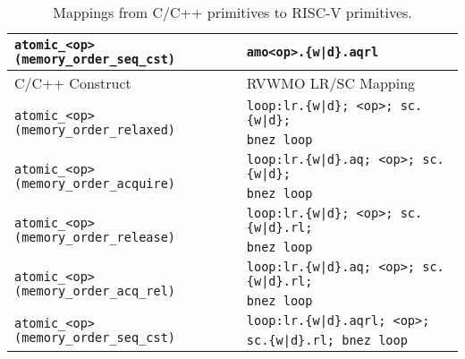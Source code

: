 \begin{table}[h!]
\begin{tabular}{|l|l|}
    \hline
    \tt atomic\_<op>(memory\_order\_seq\_cst) & \tt amo<op>.\{w|d\}.aqrl \\
    \hline
    \hline
    C/C++ Construct                           & RVWMO LR/SC Mapping\\
    \hline
    \multirow{2}{*}{\tt atomic\_<op>(memory\_order\_relaxed)}
      & \tt loop:\@ lr.\{w|d\}; <op>; sc.\{w|d\}; \\
      & \tt bnez loop \\
    \hline
    \multirow{2}{*}{\tt atomic\_<op>(memory\_order\_acquire)}
      & \tt loop:\@ lr.\{w|d\}.aq; <op>; sc.\{w|d\}; \\
      & \tt bnez loop \\
    \hline
    \multirow{2}{*}{\tt atomic\_<op>(memory\_order\_release)}
      & \tt loop:\@ lr.\{w|d\}; <op>; sc.\{w|d\}.rl; \\
      & \tt bnez loop \\
    \hline
    \multirow{2}{*}{\tt atomic\_<op>(memory\_order\_acq\_rel)}
      & \tt loop:\@ lr.\{w|d\}.aq; <op>; sc.\{w|d\}.rl; \\
      & \tt bnez loop \\
    \hline
    \multirow{2}{*}{\tt atomic\_<op>(memory\_order\_seq\_cst)}
      & \tt loop:\@ lr.\{w|d\}.aqrl; <op>; \\
      & \tt sc.\{w|d\}.rl; bnez loop \\
    \hline
  \end{tabular}
  \caption{Mappings from C/C++ primitives to RISC-V primitives.}
  \label{tab:c11mappings}
\end{table}


